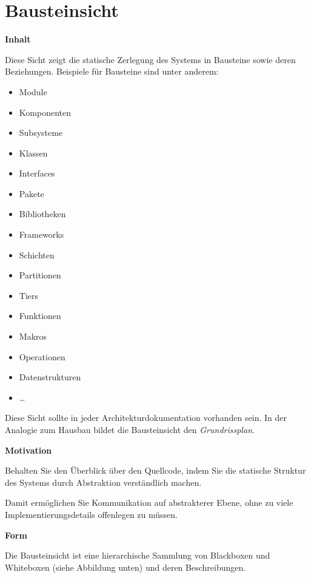 \hypertarget{bausteinsicht}{%
\section{Bausteinsicht}\label{bausteinsicht}}

\textbf{Inhalt}

Diese Sicht zeigt die statische Zerlegung des Systems in Bausteine sowie
deren Beziehungen. Beispiele für Bausteine sind unter anderem:

\begin{itemize}
\tightlist
\item
  Module
\item
  Komponenten
\item
  Subsysteme
\item
  Klassen
\item
  Interfaces
\item
  Pakete
\item
  Bibliotheken
\item
  Frameworks
\item
  Schichten
\item
  Partitionen
\item
  Tiers
\item
  Funktionen
\item
  Makros
\item
  Operationen
\item
  Datenstrukturen
\item
  \ldots{}
\end{itemize}

Diese Sicht sollte in jeder Architekturdokumentation vorhanden sein. In
der Analogie zum Hausbau bildet die Bausteinsicht den
\emph{Grundrissplan}.

\textbf{Motivation}

Behalten Sie den Überblick über den Quellcode, indem Sie die statische
Struktur des Systems durch Abstraktion verständlich machen.

Damit ermöglichen Sie Kommunikation auf abstrakterer Ebene, ohne zu
viele Implementierungsdetails offenlegen zu müssen.

\textbf{Form}

Die Bausteinsicht ist eine hierarchische Sammlung von Blackboxen und
Whiteboxen (siehe Abbildung unten) und deren Beschreibungen.

